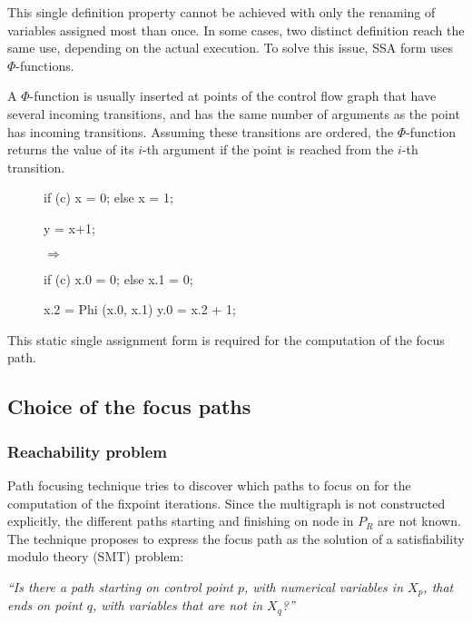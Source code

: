 \documentclass[a4paper,english,titlepage,11pt]{report}
\begin{document}
This single definition property cannot be achieved with only the renaming of
variables assigned most than once. In some cases, two distinct definition reach
the same use, depending on the actual execution. To solve this issue, SSA form
uses $\Phi$-functions.

A $\Phi$-function is usually inserted at points of the control flow graph that
have several incoming transitions, and has the same number of arguments as the point
has incoming transitions. Assuming these transitions are ordered, the
$\Phi$-function returns the value of its $i$-th argument if the point is reached
from the $i$-th transition.

\begin{figure}[!h]
\centering
\begin{minipage}[c]{.39\linewidth}
\begin{C}
if (c) x = 0;
else x = 1;

y = x+1;
\end{C}
\end{minipage} 
$\Longrightarrow$ \hfill
\begin{minipage}[c]{.49\linewidth}
\begin{C}
if (c) x.0 = 0;
else x.1 = 0;

x.2 = Phi (x.0, x.1)
y.0 = x.2 + 1;
\end{C}
\end{minipage}
\end{figure}
\FloatBarrier

This static single assignment form is required for the computation of the focus
path.

	\subsection{Choice of the focus paths}

	\subsubsection{Reachability problem}
	\label{reachability}
	Path focusing technique tries to discover which paths to focus on for the
	computation of the fixpoint iterations. 
	Since the multigraph is not constructed explicitly, the different paths
	starting and finishing on node in $P_R$ are not known. 
	The technique proposes to express the focus path as the solution of a
	satisfiability modulo theory (SMT) problem:

	\begin{center} \emph{
		``Is there a path starting on control point $p$, with numerical
		variables in $X_p$, that ends on point $q$, with variables that are not
		in $X_q$?''}
	\end{center}
\end{document}
